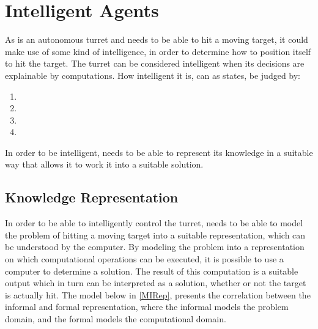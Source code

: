 \section{Intelligent Agents}
 
As \name is an autonomous turret and needs to be able to hit a moving target,
it could make use of some kind of intelligence, in order to determine how to
position itself to hit the target. The turret can be considered intelligent when
its decisions are explainable by computations. How intelligent it is, can as
\citep[ch.1.1,p.4]{MIBook} states, be judged by:

\begin{enumerate}
  \item {}
  \item {}
  \item {}
  \item {}
\end{enumerate}

In order to be intelligent, \name needs to be able to represent its
knowledge in a suitable way that allows it to work it into a suitable solution. 

\subsection{Knowledge Representation}\label{KR}

In order to be able to intelligently control the turret, \name needs to be able
to model the problem of hitting a moving target into a suitable representation,
which can be understood by the computer. By modeling the problem into a
representation on which computational operations can be executed, it is possible
to use a computer to determine a solution. The result of this computation is a
suitable output which in turn can be interpreted as a solution, whether or not
the target is actually hit. The model below in \autoref{MIRep}, presents the
correlation between the informal and formal representation, where the informal
models the problem domain, and the formal models the computational domain.


